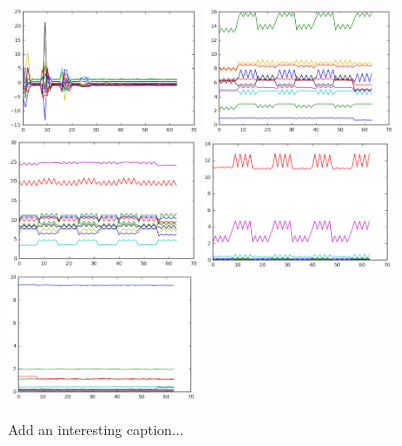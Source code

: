 			\begin{figure}[h]
				\centering
				\includegraphics[width=0.45\textwidth]{images/multiPosGraphConvFC}
				\includegraphics[width=0.45\textwidth]{images/multiPosGraphConvCAM}
				\includegraphics[width=0.45\textwidth]{images/multiPosGraphConvCAM2}
				\includegraphics[width=0.45\textwidth]{images/multiPosGraphConvCAM2_L1}
				\includegraphics[width=0.45\textwidth]{images/multiPosGraphConvnopool_CAM2_L1}
				\caption{Add an interesting caption...}
				\label{fig:multipose_graph_1}
			\end{figure}

